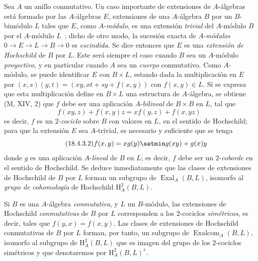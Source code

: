 \begin{env}[18.4.3]
\label{0.18.4.3-es}
Sea $A$ un anillo conmutativo. Un caso importante de extensiones de
$A$-álgebras está formado por las $A$-álgebras $E$, extensiones de una $A$-álgebra $B$
por un $B$-bimódulo $L$ tales que $E$, como $A$-\emph{módulo}, es una
extensión \emph{trivial} del $A$-módulo $B$ por el $A$-módulo $L$~; dicho de otro
modo, la sucesión exacta de $A$-\emph{módulos}
$0\to E\to L\to B\to0$ es \emph{escindida}. Se dice entonces que $E$ es una
\emph{extensión de Hochschild} de $B$ por $L$. Este será siempre el caso cuando
$B$ sea un $A$-módulo \emph{proyectivo}, y en particular cuando $A$ sea un
\emph{cuerpo} conmutativo. Como $A$-módulo, se puede identificar $E$ con
$B\times L$, estando dada la multiplicación en $E$ por
$(x,s)(y,t)=(xy,xt+sy+f(x,y))$ con $f(x,y)\in L$. Si se expresa que esta
multiplicación define en $B\times L$ una estructura de $A$-álgebra, se obtiene
(M, XIV, 2) que $f$ debe ser una aplicación $A$-\emph{bilineal} de
$B\times B$ en $L$, tal que
\begin{equation}
\label{0.18.4.3.1-es}
\tag{18.4.3.1}
  f(xy,z)+f(x,y)z=xf(y,z)+f(x,yz)
\end{equation}
es decir, $f$ es un $2$-\emph{cociclo} sobre $B$ con valores en $L$, en el
sentido de Hochschild; para que la extensión $E$ sea $A$-trivial, es necesario
y suficiente que se tenga
\begin{equation}
\label{0.18.4.3.2-es}
\tag{18.4.3.2}
  f(x,y)=xg(y)\setmin g(xy)+g(x)y
\end{equation}
donde $g$ es una aplicación $A$-\emph{lineal} de $B$ en $L$; es decir, $f$
debe ser un $2$-\emph{coborde} en el sentido de Hochschild. Se deduce
inmediatamente que las clases de extensiones de Hochschild de $B$ por $L$
forman un subgrupo de $\operatorname{Exal}_A(B,L)$, isomorfo al \emph{grupo de
cohomología} de Hochschild $\mathrm H_A^2(B,L)$.

Si $B$ es una $A$-álgebra \emph{conmutativa}, y $L$ un $B$-módulo, las
extensiones de Hochschild \emph{conmutativas} de $B$ por $L$ corresponden a los
$2$-cociclos \emph{simétricos}, es decir, tales que $f(y,x)=f(x,y)$. Las clases
de extensiones de Hochschild conmutativas de $B$ por $L$ forman, por tanto, un
subgrupo de $\operatorname{Exalcom}_A(B,L)$, isomorfo al subgrupo de
$\mathrm H_A^2(B,L)$ que es imagen del grupo de los $2$-cociclos simétricos y
que denotaremos por $\mathrm H_A^2(B,L)^s$.
\end{env}

